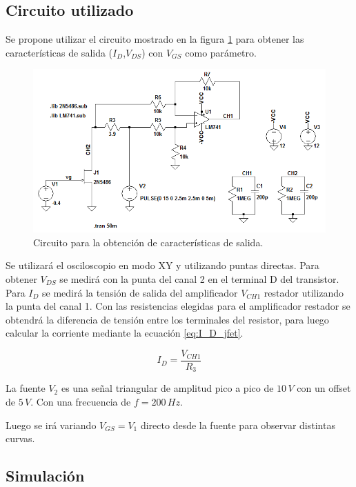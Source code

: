 \documentclass[10pt,spanish,a4paper,notitlepage]{article}
\begin{document}
\subsection{Circuito utilizado}

Se propone utilizar el circuito mostrado en la figura 
\ref{circuito:simulacion_jfet} para obtener las características de salida 
($I_D$,$V_{DS}$) con $V_{GS}$ como parámetro.


\begin{figure}[H]
\centering
\includegraphics[scale=0.6]{circuitos/2_banco.png}
\caption{Circuito para la obtención de características de salida.}
\label{circuito:simulacion_jfet}
\end{figure}

Se utilizará el osciloscopio en modo XY y utilizando puntas directas.
Para obtener $V_{DS}$ se medirá con la punta del canal 2 en el terminal D del
transistor.
Para $I_D$ se medirá la tensión de salida del amplificador $V_{CH1}$ restador utilizando
la punta del canal 1.
Con las resistencias elegidas para el amplificador restador se obtendrá la diferencia
de tensión entre los terminales del resistor, para luego calcular la corriente
mediante la ecuación \ref{eq:I_D_jfet}. 

\begin{equation}
I_D = \frac{V_{CH1}}{R_3}
\label{eq:I_D_jfet}
\end{equation}


La fuente $V_2$ es una señal triangular de amplitud pico a pico de $10\,\unit{V}$ con
un offset de $5\,\unit{V}$. Con una frecuencia de $f=200\,\unit{Hz}$.

Luego se irá variando $V_{GS} = V_1$ directo desde la fuente para observar
distintas curvas.

\subsection{Simulación}
\end{document}

